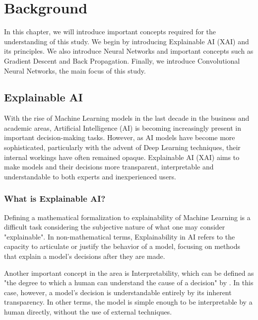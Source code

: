 


\enlargethispage{-1\baselineskip}

\chapter{Background}

In this chapter, we will introduce important concepts required for the understanding of this study.
We begin by introducing Explainable AI (XAI) and its principles. We also introduce Neural Networks and important concepts such as Gradient Descent and Back Propagation. 
Finally, we introduce Convolutional Neural Networks, the main focus of this study.

\section{Explainable AI}

With the rise of Machine Learning models in the last decade in the business and academic areas, Artificial Intelligence (AI) is becoming increasingly present in important decision-making tasks. 
However, as AI models have become more sophisticated, particularly with the advent of Deep Learning techniques, their internal workings have often remained opaque. 
Explainable AI (XAI) aims to make models and their decisions more transparent, interpretable and understandable to both experts and inexperienced users.

\subsection{What is Explainable AI?}
\label{sec:what_is_xai}
Defining a mathematical formalization to explainability of Machine Learning is a difficult task considering the subjective nature of what one may consider "explainable". In non-mathematical terms, 
Explainability in AI refers to the capacity to articulate or justify the behavior of a model, focusing on methods that explain a model's decisions after they are made.

Another important concept in the area is Interpretability, which can be defined as "the degree to which a human can understand the cause of a decision" by \cite{miller2018explanationartificialintelligenceinsights}.
In this case, however, a model's decision is understandable entirely by its inherent transparency. In other terms, the model is simple enough to be interpretable by a human directly, without the use of external techniques.

